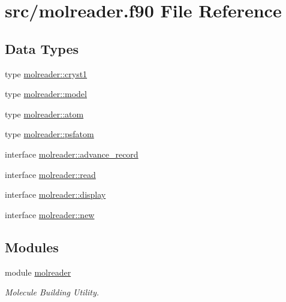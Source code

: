 \hypertarget{molreader_8f90}{}\section{src/molreader.f90 File Reference}
\label{molreader_8f90}
\subsection*{Data Types}
\begin{DoxyCompactItemize}
\item 
type \hyperlink{structmolreader_1_1cryst1}{molreader\+::cryst1}
\item 
type \hyperlink{structmolreader_1_1model}{molreader\+::model}
\item 
type \hyperlink{structmolreader_1_1atom}{molreader\+::atom}
\item 
type \hyperlink{structmolreader_1_1psfatom}{molreader\+::psfatom}
\item 
interface \hyperlink{interfacemolreader_1_1advance__record}{molreader\+::advance\+\_\+record}
\item 
interface \hyperlink{interfacemolreader_1_1read}{molreader\+::read}
\item 
interface \hyperlink{interfacemolreader_1_1display}{molreader\+::display}
\item 
interface \hyperlink{interfacemolreader_1_1new}{molreader\+::new}
\end{DoxyCompactItemize}
\subsection*{Modules}
\begin{DoxyCompactItemize}
\item 
module \hyperlink{namespacemolreader}{molreader}
\begin{DoxyCompactList}\small\item\em Molecule Building Utility. \end{DoxyCompactList}\end{DoxyCompactItemize}
